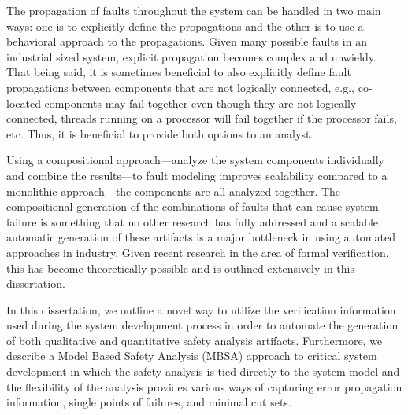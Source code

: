 The propagation of faults throughout the system can be handled in two main ways: one is to explicitly define the propagations and the other is to use a behavioral approach to the propagations. Given many possible faults in an industrial sized system, explicit propagation becomes complex and unwieldy. That being said, it is sometimes beneficial to also explicitly define fault propagations between components that are not logically connected, e.g., co-located components may fail together even though they are not logically connected, threads running on a processor will fail together if the processor fails, etc. Thus, it is beneficial to provide both options to an analyst. 

Using a compositional approach---analyze the system components individually and combine the results---to fault modeling improves scalability compared to a monolithic approach---the components are all analyzed together. The compositional generation of the combinations of faults that can cause system failure is something that no other research has fully addressed and a scalable automatic generation of these artifacts is a major bottleneck in using automated approaches in industry. Given recent research in the area of formal verification, this has become theoretically possible and is outlined extensively in this dissertation.


In this dissertation, we outline a novel way to utilize the verification information used during the system development process in order to automate the generation of both qualitative and quantitative safety analysis artifacts. Furthermore, we describe a Model Based Safety Analysis (MBSA) approach to critical system development in which the safety analysis is tied directly to the system model and the flexibility of the analysis provides various ways of capturing error propagation information, single points of failures, and minimal cut sets.

